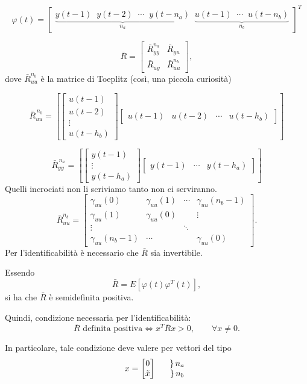 \documentclass[11pt,a4paper]{article}
\begin{document}
\[
\varphi(t)=
\begin{bmatrix}
\underbrace{y(t-1)\;\; y(t-2)\;\; \cdots\;\; y(t-n_a)}_{n_a}
\;\;
\underbrace{u(t-1)\;\; \cdots\;\; u(t-n_b)}_{n_b}
\end{bmatrix}^{T}
\]

\[
\bar R=\begin{bmatrix}\bar R_{yy}^{n_a} & \bar R_{yu}\\ \bar R_{uy} & \bar R_{uu}^{n_b}\end{bmatrix},
\]
dove $\bar R_{uu}^{n_b}$ è la matrice di Toeplitz (così, una piccola curiosità)

\[
\bar R^{\,n_b}_{uu}
=
\left[
\begin{bmatrix}
u(t-1)\\
u(t-2)\\
\vdots\\
u(t-h_b)
\end{bmatrix}
\begin{bmatrix}
u(t-1) & u(t-2) & \cdots & u(t-h_b)
\end{bmatrix}
\right]
\]

\[
\bar R^{\,n_a}_{yy}
=
\left[
\begin{bmatrix}
y(t-1)\\
\vdots\\
y(t-h_a)
\end{bmatrix}
\begin{bmatrix}
y(t-1) & \cdots & y(t-h_a)
\end{bmatrix}
\right]
\]
Quelli incrociati non li scriviamo tanto non ci serviranno.
\[
\bar R_{uu}^{n_b}=\begin{bmatrix}\gamma_{uu}(0)&\gamma_{uu}(1)&\cdots&\gamma_{uu}(n_b-1)\\ \gamma_{uu}(1)&\gamma_{uu}(0)&&\vdots\\ \vdots&&\ddots&\\ \gamma_{uu}(n_b-1)&\cdots&&\gamma_{uu}(0)\end{bmatrix}.
\]
Per l'identificabilità è necessario che $\bar R$ sia invertibile.

Essendo
\[
\bar R = E\!\left[\varphi(t)\varphi^{T}(t)\right],
\]
si ha che $\bar R$ è semidefinita positiva.

Quindi, condizione necessaria per l'identificabilità:
\[
\bar R \text{ definita positiva}
\iff
x^{T}\bar R x>0,\qquad \forall x\neq 0.
\]

In particolare, tale condizione deve valere per vettori del tipo
\[
x=
\begin{bmatrix}
0\\
\tilde x
\end{bmatrix}
\quad
\begin{array}{c}
\left.\vphantom{\tilde x}\right\} n_a\\
\left.\vphantom{\tilde x}\right\} n_b
\end{array}
\]
\end{document}
